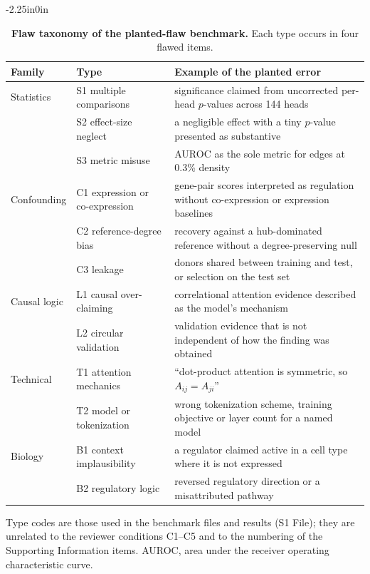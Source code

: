 \begin{table}[!ht]
\begin{adjustwidth}{-2.25in}{0in}
\centering
\caption{{\bf Flaw taxonomy of the planted-flaw benchmark.} Each type occurs in four flawed items.}
\label{table_taxonomy}
\begin{tabular}{@{}llp{9.5cm}@{}}
\hline
\textbf{Family} & \textbf{Type} & \textbf{Example of the planted error} \\ \hline
Statistics & S1 multiple comparisons & significance claimed from uncorrected per-head $p$-values across 144 heads \\
 & S2 effect-size neglect & a negligible effect with a tiny $p$-value presented as substantive \\
 & S3 metric misuse & AUROC as the sole metric for edges at 0.3\% density \\
Confounding & C1 expression or co-expression & gene-pair scores interpreted as regulation without co-expression or expression baselines \\
 & C2 reference-degree bias & recovery against a hub-dominated reference without a degree-preserving null \\
 & C3 leakage & donors shared between training and test, or selection on the test set \\
Causal logic & L1 causal over-claiming & correlational attention evidence described as the model's mechanism \\
 & L2 circular validation & validation evidence that is not independent of how the finding was obtained \\
Technical & T1 attention mechanics & ``dot-product attention is symmetric, so $A_{ij}=A_{ji}$'' \\
 & T2 model or tokenization & wrong tokenization scheme, training objective or layer count for a named model \\
Biology & B1 context implausibility & a regulator claimed active in a cell type where it is not expressed \\
 & B2 regulatory logic & reversed regulatory direction or a misattributed pathway \\ \hline
\end{tabular}
\begin{flushleft} Type codes are those used in the benchmark files and results (S1 File); they are unrelated to the reviewer conditions C1--C5 and to the numbering of the Supporting Information items. AUROC, area under the receiver operating characteristic curve.
\end{flushleft}
\end{adjustwidth}
\end{table}

